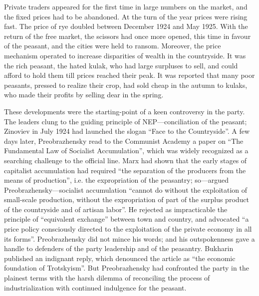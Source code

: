 Private traders appeared for the first time in large numbers on the market, and the fixed prices had to be abandoned. At the turn of the year prices were rising fast. The price of rye doubled between December 1924 and May 1925. With the return of the free market, the scissors had once more opened, this time in favour of the peasant, and the cities were held to ransom. Moreover, the price mechanism operated to increase disparities of wealth in the countryside. It was the rich peasant, the hated kulak, who had large surpluses to sell, and could afford to hold them till prices reached their peak. It was reported that many poor peasants, pressed to realize their crop, had sold cheap in the autumn to kulaks, who made their profits by selling dear in the spring. 

These developments were the starting-point of a keen controversy in the party. The leaders clung to the guiding principle of NEP---conciliation of the peasant; Zinoviev in July 1924 had launched the slogan ``Face to the Countryside''. A few days later, Preobrazhensky read to the Communist Academy a paper on ``The Fundamental Law of Socialist Accumulation'', which was widely recognized as a searching challenge to the official line. Marx had shown that the early stages of capitalist accumulation had required ``the separation of the producers from the means of production'', i.e. the expropriation of the peasantry; so---argued Preobrazhensky---socialist accumulation ``cannot do without the exploitation of small-scale production, without the expropriation of part of the surplus product of the countryside and of artisan labor''. He rejected as impracticable the principle of ``equivalent exchange'' between town and country, and advocated ``a price policy consciously directed to the exploitation of the private economy in all its forms''. Preobrazhensky did not mince his words; and his outspokenness gave a handle to defenders of the party leadership and of the peasantry. Bukharin published an indignant reply, which denounced the article as ``the economic foundation of Trotskyism''. But Preobrazhensky had confronted the party in the plainest terms with the harsh dilemma of reconciling the process of industrialization with continued indulgence for the peasant. 


